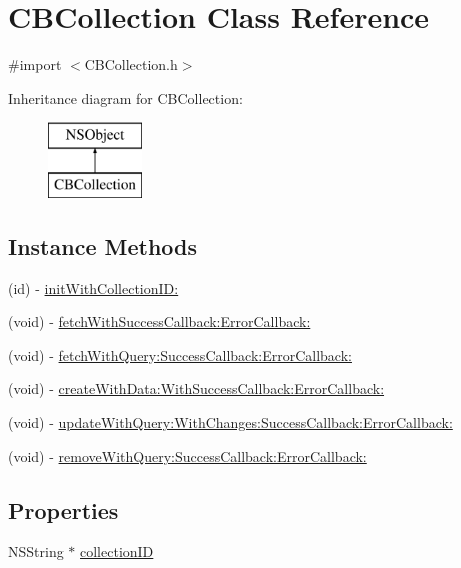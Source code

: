 \hypertarget{interface_c_b_collection}{\section{C\-B\-Collection Class Reference}
\label{interface_c_b_collection}
}


{\ttfamily \#import $<$C\-B\-Collection.\-h$>$}

Inheritance diagram for C\-B\-Collection\-:\begin{figure}[H]
\begin{center}
\leavevmode
\includegraphics[height=2.000000cm]{interface_c_b_collection}
\end{center}
\end{figure}
\subsection*{Instance Methods}
\begin{DoxyCompactItemize}
\item 
(id) -\/ \hyperlink{interface_c_b_collection_ad232890eefe5c505991479ac6f018f9a}{init\-With\-Collection\-I\-D\-:}
\item 
(void) -\/ \hyperlink{interface_c_b_collection_a9fdaad4ec27dec86a1b6ff5af2583f0d}{fetch\-With\-Success\-Callback\-:\-Error\-Callback\-:}
\item 
(void) -\/ \hyperlink{interface_c_b_collection_afa23ffb4db085f37b6821160e455a2fb}{fetch\-With\-Query\-:\-Success\-Callback\-:\-Error\-Callback\-:}
\item 
(void) -\/ \hyperlink{interface_c_b_collection_a393aef7a45fd8018d3ac32ced65a0fe7}{create\-With\-Data\-:\-With\-Success\-Callback\-:\-Error\-Callback\-:}
\item 
(void) -\/ \hyperlink{interface_c_b_collection_aa81d5745750e040b5333ab23db03884e}{update\-With\-Query\-:\-With\-Changes\-:\-Success\-Callback\-:\-Error\-Callback\-:}
\item 
(void) -\/ \hyperlink{interface_c_b_collection_abace3dfeee95833dfca05e9040426372}{remove\-With\-Query\-:\-Success\-Callback\-:\-Error\-Callback\-:}
\end{DoxyCompactItemize}
\subsection*{Properties}
\begin{DoxyCompactItemize}
\item 
N\-S\-String $\ast$ \hyperlink{interface_c_b_collection_a526d5990ac9db1922300bc55bc764fc1}{collection\-I\-D}
\end{DoxyCompactItemize}


